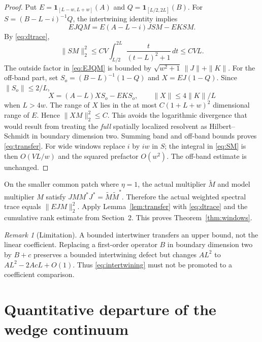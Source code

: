 \documentclass[11pt]{amsart}
\numberwithin{equation}{section}
\theoremstyle{remark}
\newtheorem{remark}[theorem]{Remark}
\newcommand{\one}{\mathbf{1}}
\begin{document}
\begin{proof}
Put $E=\one_{[L-w,L+w]}(A)$ and $Q=\one_{[L/2,2L]}(B)$. For $S=(B-L-i)^{-1}Q$, the intertwining identity implies
\begin{equation}\label{eq:EJQM}
EJQM=E(A-L-i)JSM-EKSM .
\end{equation}
By \eqref{eq:dtrace},
\begin{equation}\label{eq:SM}
\|SM\|_2^2\le CV\int_{L/2}^{2L}\frac{t}{(t-L)^2+1}\,dt\le CVL .
\end{equation}
The outside factor in \eqref{eq:EJQM} is bounded by $\sqrt{w^2+1}\,\|J\|+\|K\|$. For the off-band part, set $S_o=(B-L)^{-1}(1-Q)$ and $X=EJ(1-Q)$. Since $\|S_o\|\le2/L$,
\begin{equation}\label{eq:offband}
X=(A-L)XS_o-EKS_o,\qquad \|X\|\le4\|K\|/L
\end{equation}
when $L>4w$. The range of $X$ lies in the at most $C(1+L+w)^2$ dimensional range of $E$. Hence $\|XM\|_2^2\le C$. This avoids the logarithmic divergence that would result from treating the \emph{full} spatially localized resolvent as Hilbert--Schmidt in boundary dimension two. Summing band and off-band bounds proves \eqref{eq:transfer}. For wide windows replace $i$ by $iw$ in $S$; the integral in \eqref{eq:SM} is then $O(VL/w)$ and the squared prefactor $O(w^2)$. The off-band estimate is unchanged.
\end{proof}

On the smaller common patch where $\eta=1$, the actual multiplier $\widetilde M$ and model multiplier $M$ satisfy $JMM^*J^*=\widetilde M\widetilde M^*$. Therefore the actual weighted spectral trace equals $\|EJM\|_2^2$. Apply Lemma~\ref{lem:transfer} with \eqref{eq:dtrace} and the cumulative rank estimate from Section~2. This proves Theorem~\ref{thm:windows}.

\begin{remark}[Limitation]
A bounded intertwiner transfers an upper bound, not the linear coefficient. Replacing a first-order operator $B$ in boundary dimension two by $B+c$ preserves a bounded intertwining defect but changes $AL^2$ to $AL^2-2AcL+O(1)$. Thus \eqref{eq:intertwining} must not be promoted to a coefficient comparison.
\end{remark}

\section{Quantitative departure of the wedge continuum}
\end{document}
